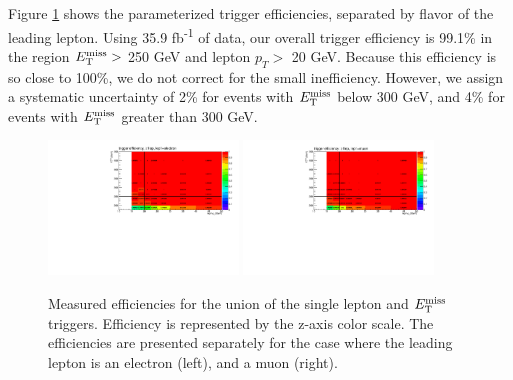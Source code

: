 Figure \ref{fig:stop:trigeff:1lepmet} shows the parameterized trigger
efficiencies, separated by flavor of the leading lepton. Using 35.9 fb\textsuperscript{-1}
of data, our overall trigger efficiency is 99.1\% in the region $E_\text{T}^\text{miss} >$
250 GeV and lepton $p_T >$ 20 GeV. Because this efficiency is so close
to 100\%, we do not correct for the small inefficiency. However, we
assign a systematic uncertainty of 2\% for events with $E_\text{T}^\text{miss}$ below 300
GeV, and 4\% for events with $E_\text{T}^\text{miss}$ greater than 300 GeV.

\begin{figure}[htb]
\centering
\includegraphics[width=0.45\textwidth]{figures/TriggerEff_el.pdf}
\includegraphics[width=0.45\textwidth]{figures/TriggerEff_mu.pdf}
\caption{Measured efficiencies for the union of the single lepton and
  $E_\text{T}^\text{miss}$ triggers. Efficiency is represented by the z-axis color scale. The
  efficiencies are presented separately for the case where the leading
  lepton is an electron (left), and a muon (right).}
\label{fig:stop:trigeff:1lepmet}
\end{figure}

